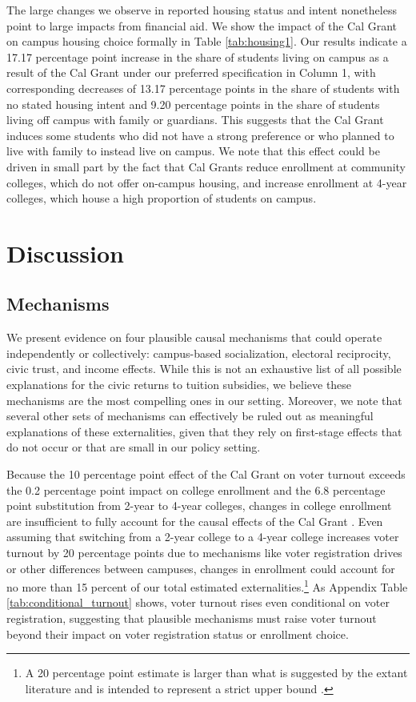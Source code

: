 \documentclass[12pt,letterpaper,oneside]{book}
\begin{document}
 The large changes we observe in reported housing status and intent nonetheless point to large impacts from financial aid. We show the impact of the Cal Grant on campus housing choice formally in Table \ref{tab:housing1}. Our results indicate a 17.17 percentage point increase in the share of students living on campus as a result of the Cal Grant under our preferred specification in Column 1, with corresponding decreases of 13.17 percentage points in the share of students with no stated housing intent and 9.20 percentage points in the share of students living off campus with family or guardians. This suggests that the Cal Grant induces some students who did not have a strong preference or who planned to live with family to instead live on campus. We note that this effect could be driven in small part by the fact that Cal Grants reduce enrollment at community colleges, which do not offer on-campus housing, and increase enrollment at 4-year colleges, which house a high proportion of students on campus.

\section{Discussion} \label{sec:discussion}
\subsection{Mechanisms}

We present evidence on four plausible causal mechanisms that could operate independently or collectively: campus-based socialization, electoral reciprocity, civic trust, and income effects. While this is not an exhaustive list of all possible explanations for the civic returns to tuition subsidies, we believe these mechanisms are the most compelling ones in our setting. Moreover, we note that several other sets of mechanisms can effectively be ruled out as meaningful explanations of these externalities, given that they rely on first-stage effects that do not occur or that are small in our policy setting.

Because the 10 percentage point effect of the Cal Grant on voter turnout exceeds the 0.2 percentage point impact on college enrollment and the 6.8 percentage point substitution from 2-year to 4-year colleges, changes in college enrollment are insufficient to fully account for the causal effects of the Cal Grant \citep{bettinger_long-run_2019}. Even assuming that switching from a 2-year college to a 4-year college increases voter turnout by 20 percentage points due to mechanisms like voter registration drives or other differences between campuses, changes in enrollment could account for no more than 15 percent of our total estimated externalities.\footnote{A 20 percentage point estimate is larger than what is suggested by the extant literature and is intended to represent a strict upper bound \citep{bell_which_2024}. } As Appendix Table \ref{tab:conditional_turnout} shows, voter turnout rises even conditional on voter registration, suggesting that plausible mechanisms must raise voter turnout beyond their impact on voter registration status or enrollment choice.
\end{document}
